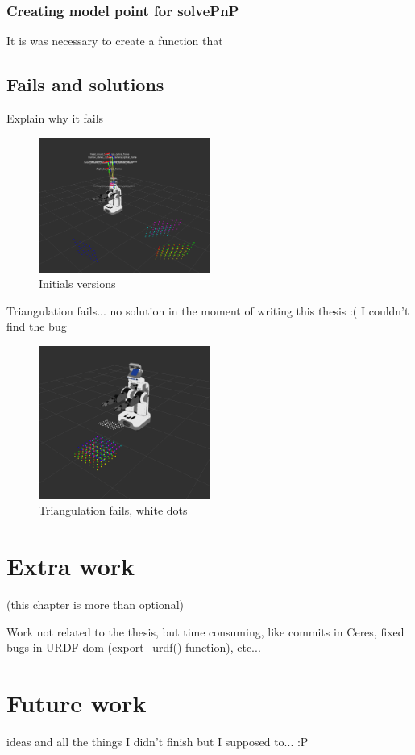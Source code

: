 \subsection{Creating model point for solvePnP}
\label{sec:solvePnP_impl}
It is was necessary to create a function that


\section{Fails and solutions}

Explain why it fails
\begin{figure}[!htbp]
 \centering
 \includegraphics[width=0.5\textwidth]{images/screenshots/optimization_failer02_2.png}
 \caption{Initials versions}
 \label{fig:optimization_failer}
\end{figure}


Triangulation fails... no solution in the moment of writing this thesis :( I couldn't find the bug
\begin{figure}[!htbp]
 \centering
 \includegraphics[width=0.5\textwidth]{images/screenshots/triangulation_fails.png}
 \caption{Triangulation fails, white dots}
 \label{fig:triangulation_fails}
\end{figure}




\chapter{Extra work}
\label{cha:extra}

(this chapter is more than optional)

Work not related to the thesis, but time consuming, like commits in Ceres, fixed bugs in URDF dom (export\_urdf() function), etc...



\chapter{Future work}
\label{cha:future}

ideas and all the things I didn't finish but I supposed to... :P
